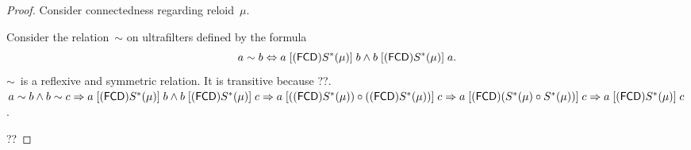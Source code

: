 \begin{proof}

Consider connectedness regarding reloid~$\mu$.

Consider the relation~$\sim$ on ultrafilters defined by the formula
\[ a\sim b\Leftrightarrow a\mathrel{\left[(\mathsf{FCD}) S^\ast(\mu)\right]}b \land
b\mathrel{\left[(\mathsf{FCD}) S^\ast(\mu)\right]}a. \]
$\sim$~is a reflexive and symmetric relation.
It is transitive because ??.
$a\sim b\land b\sim c \Rightarrow
a\mathrel{\left[(\mathsf{FCD}) S^\ast(\mu)\right]}b \land b\mathrel{\left[(\mathsf{FCD}) S^\ast(\mu)\right]}c
\Rightarrow
a\mathrel{\left[((\mathsf{FCD}) S^\ast(\mu))\circ((\mathsf{FCD}) S^\ast(\mu))\right]}c
\Rightarrow
a\mathrel{\left[(\mathsf{FCD})(S^\ast(\mu)\circ S^\ast(\mu))\right]}c
\Rightarrow
a\mathrel{\left[(\mathsf{FCD}) S^\ast(\mu)\right]}c$.

??
\end{proof}

